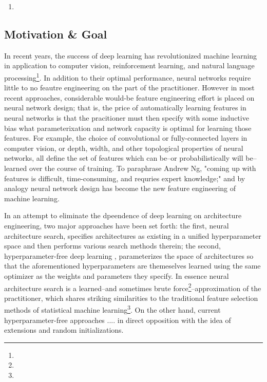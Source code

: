 \documentclass[12pt]{article}
\begin{document}
\begin{enumerate}
\begin{itemize}
		An interesting sub-experiment here would be something to do with comparison to how RL performs on a descrete representation of hyperaparameters using DDPG with a non-differentaible transition function\footnote{This basically forces the continuous actions of the actor to be in a softmax distribution and then selects the argmax as the discrete action.} If continuous outperforms the standard results, it becomes adventageous outside of DNAS literature like DNAS and Neural Fabrics.
	\end{itemize}
	\item {}

\end{enumerate}


\subsection{Motivation \& Goal}


In recent years, the success of deep learning has revolutionized machine learning in application to computer vision, reinforcement learning, and natural language processing\footnote{}. In addition to their optimal performance, neural networks require little to no feautre engineering on the part of the practitioner. However in most recent approaches, considerable would-be feature engineering effort is placed on neural network design; that is, the price of automatically learning features in neural networks is that the pracitioner must then specify with some inductive bias what parameterixation and network capacity is optimal for learning those features. For example, the choice of convolutional or fully-connected layers in computer vision, or depth, width, and other topological properties of neural networks, all define the set of features which can be--or probabilistically will be--learned over the course of training.  To paraphrase Andrew Ng, "coming up with features is difficult, time-consuming, and requries expert knowledge;" and by analogy neural network design has become the new feature engineering of machine learning.

In an attempt to eliminate the dpeendence of deep learning on architecture engineering, two major approaches have been set forth: the first, neural architecture search, specifies architectures as existing in a unified hyperparameter space and then performs various search methods therein; the second, hyperparameter-free deep learning , parameterizes the space of architectures so that the aforementioned hyperparameters are themeselves learned using the same optimizer as the weights and parameters they specify. In essence neural architecture search is a learned--and sometimes brute force\footnote{}--approximation of the practitioner, which shares striking similarities to the traditional feature selection methods of statistical machine learning\footnote{}. On the other hand, current hyperparameter-free approaches .... in direct opposition with the idea of extensions and random initializations. 
\end{document}
